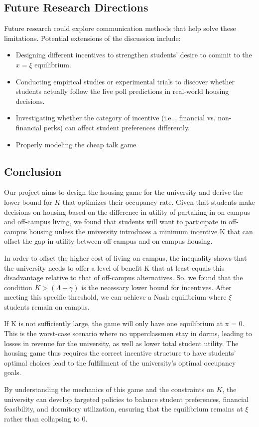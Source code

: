 \documentclass[12pt]{article}
\begin{document}
\subsection{Future Research Directions}
Future research could explore communication methods that help solve these limitations. Potential extensions of the discussion include:
\begin{itemize}
    \item Designing different incentives to strengthen students’ desire to commit to the $x  = \xi$    equilibrium.
    \item Conducting empirical studies or experimental trials to discover whether students actually follow the live poll predictions in real-world housing decisions.
    \item Investigating whether the category of incentive (i.e.., financial vs. non-financial perks) can affect student preferences differently.
    \item Properly modeling the cheap talk game
\end{itemize}
\subsection{Conclusion}
Our project aims to design the housing game for the university and derive the lower bound for $K$ that optimizes their occupancy rate. Given that students make decisions on housing based on the difference in utility of partaking in on-campus and off-campus living, we found that students will want to participate in off-campus housing unless the university introduces a minimum incentive K that can offset the gap in utility between off-campus and on-campus housing. 

In order to offset the higher cost of living on campus, the inequality shows that the university needs to offer a level of benefit K that at least equals this disadvantage relative to that of off-campus alternatives. So, we found that the condition $K > (\Lambda - \gamma)$ is the necessary lower bound for incentives. After meeting this specific threshold, we can achieve a Nash equilibrium where $\xi$ students remain on campus.

If K is not sufficiently large, the game will only have one equilibrium at x = 0. This is the worst-case scenario where no upperclassmen stay in dorms, leading to losses in revenue for the university, as well as lower total student utility. The housing game thus requires the correct incentive structure to have students' optimal choices lead to the fulfillment of the university’s optimal occupancy goals.

By understanding the mechanics of this game and the constraints on $K$, the university can develop targeted policies to balance student preferences, financial feasibility, and dormitory utilization, ensuring that the equilibrium remains at $\xi$ rather than collapsing to 0.
\end{document}
